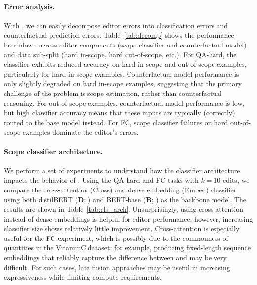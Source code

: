 \documentclass{article}
\begin{document}
\paragraph{Error analysis.}
With {\name}, we can easily decompose editor errors into classification errors and counterfactual prediction errors. Table~\ref{tab:decomp} shows the performance breakdown across editor components (scope classifier and counterfactual model) and data sub-split (hard in-scope, hard out-of-scope, etc.). For QA-hard, the classifier exhibits reduced accuracy on hard in-scope and out-of-scope examples, particularly for hard in-scope examples. Counterfactual model performance is only slightly degraded on hard in-scope examples, suggesting that the primary challenge of the problem is scope estimation, rather than counterfactual reasoning. For out-of-scope examples, counterfactual model performance is low, but high classifier accuracy means that these inputs are typically (correctly) routed to the base model instead. For FC, scope classifier failures on hard out-of-scope examples dominate the editor's errors.

\paragraph{Scope classifier architecture.}
\label{sec:cls_arch}
We perform a set of experiments to understand how the classifier architecture impacts the behavior of {\name}. Using the QA-hard and FC tasks with $k=10$ edits, we compare the cross-attention (Cross) and dense embedding (Embed) classifier using both distilBERT (\textbf{D}; \citep{Sanh2019DistilBERTAD}) and BERT-base (\textbf{B}; \citep{devlin2019bert}) as the backbone model. The results are shown in Table~\ref{tab:cls_arch}. Unsurprisingly, using cross-attention instead of dense-embeddings is helpful for editor performance; however, increasing classifier size shows relatively little improvement. Cross-attention is especially useful for the FC experiment, which is possibly due to the commonness of quantities in the VitaminC dataset; for example, producing fixed-length sequence embeddings that reliably capture the difference between  and  may be very difficult. For such cases, late fusion approaches \citep{khattab2020colbert} may be useful in increasing expressiveness while limiting compute requirements.


\end{document}
